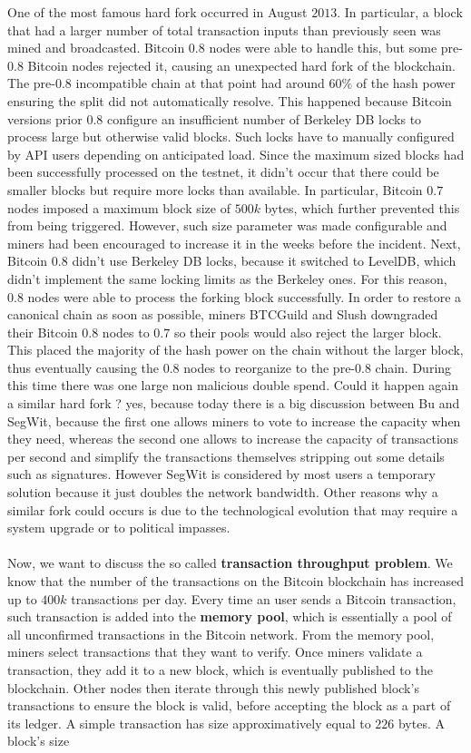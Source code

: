 One of the most famous hard fork occurred in August $2013$. In particular, a block that had a larger number of total transaction inputs than previously seen was mined and broadcasted. Bitcoin $0.8$ nodes were able to handle this, but some pre-$0.8$ Bitcoin nodes rejected it, causing an unexpected hard fork of the blockchain. The pre-$0.8$ incompatible chain at that point had around $60 \%$ of the hash power ensuring the split did not automatically resolve. This happened because Bitcoin versions prior $0.8$ configure an insufficient number of Berkeley DB locks to process large but otherwise valid blocks. Such locks have to manually configured by API users depending on anticipated load. Since the maximum sized blocks had been successfully processed on the testnet, it didn't occur that there could be smaller blocks but require more locks than available. In particular, Bitcoin $0.7$ nodes imposed a maximum block size of $500k$ bytes, which further prevented this from being triggered. However, such size parameter was made configurable and miners had been encouraged to increase it in the weeks before the incident. Next, Bitcoin $0.8$ didn't use Berkeley DB locks, because it switched to LevelDB, which didn't implement the same locking limits as the Berkeley ones. For this reason, $0.8$ nodes were able to process the forking block successfully. In order to restore a canonical chain as soon as possible, miners BTCGuild and Slush downgraded their Bitcoin $0.8$ nodes to $0.7$ so their pools would also reject the larger block. This placed the majority of the hash power on the chain without the larger block, thus eventually causing the $0.8$ nodes to reorganize to the pre-$0.8$ chain. During this time there was one large non malicious double spend. Could it happen again a similar hard fork ? yes, because today there is a big discussion between Bu and SegWit, because the first one allows miners to vote to increase the capacity when they need, whereas the second one allows to increase the capacity of transactions per second and simplify the transactions themselves stripping out some details such as signatures. However SegWit is considered by most users a temporary solution because it just doubles the network bandwidth. Other reasons why a similar fork could occurs is due to the technological evolution that may require a system upgrade or to political impasses.\\\\Now, we want to discuss the so called \textbf{transaction throughput problem}. We know that the number of the transactions on the Bitcoin blockchain has increased up to $400k$ transactions per day. Every time an user sends a Bitcoin transaction, such transaction is added into the \textbf{memory pool}, which is essentially a pool of all unconfirmed transactions in the Bitcoin network. From the memory pool, miners select transactions that they want to verify. Once miners validate a transaction, they add it to a new block, which is eventually published to the blockchain. Other nodes then iterate through this newly published block's transactions to ensure the block is valid, before accepting the block as a part of its ledger. A simple transaction has size approximatively equal to $226$ bytes. A block's size 